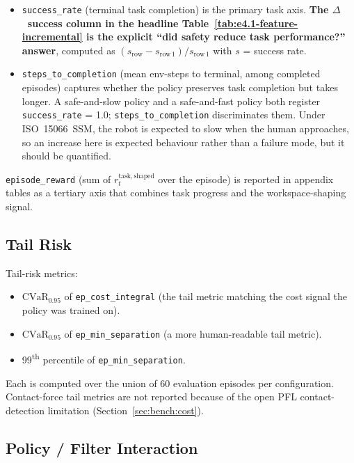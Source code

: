 \documentclass[11pt,a4paper]{report}
\newcommand{\ssm}{SSM}
\newcommand{\pfl}{PFL}
\newcommand{\iso}{ISO~15066}
\newcommand{\cvar}{\ensuremath{\mathrm{CVaR}}}
\begin{document}
\begin{itemize}[topsep=2pt,itemsep=1pt]
\item \texttt{success\_rate} (terminal task completion) is the
  primary task axis. \textbf{The $\Delta$~success column in the
  headline Table~\ref{tab:e4.1-feature-incremental} is the explicit
  ``did safety reduce task performance?'' answer}, computed as
  $(s_{\mathrm{row}} - s_{\mathrm{row\,1}})/s_{\mathrm{row\,1}}$
  with $s$ = success rate.
\item \texttt{steps\_to\_completion} (mean env-steps to terminal,
  among completed episodes) captures whether the policy preserves
  task completion but takes longer. A safe-and-slow policy and a
  safe-and-fast policy both register \texttt{success\_rate} = 1.0;
  \texttt{steps\_to\_completion} discriminates them. Under
  \iso{}~\ssm{}, the robot is expected to slow when the human
  approaches, so an increase here is expected behaviour rather than
  a failure mode, but it should be quantified.
\end{itemize}

\texttt{episode\_reward} (sum of $r^{\mathrm{task,shaped}}_t$ over
the episode) is reported in appendix tables as a tertiary axis
that combines task progress and the workspace-shaping signal.

\subsection{Tail Risk}
\label{sec:setup:metrics:tail}

Tail-risk metrics:
\begin{itemize}[topsep=2pt,itemsep=1pt]
\item $\cvar_{0.95}$ of \texttt{ep\_cost\_integral} (the tail metric
  matching the cost signal the policy was trained on).
\item $\cvar_{0.95}$ of \texttt{ep\_min\_separation} (a more
  human-readable tail metric).
\item 99\textsuperscript{th} percentile of
  \texttt{ep\_min\_separation}.
\end{itemize}
Each is computed over the union of 60 evaluation episodes per
configuration. Contact-force tail metrics are not reported because
of the open \pfl{} contact-detection limitation
(Section~\ref{sec:bench:cost}).

\subsection{Policy / Filter Interaction}
\label{sec:setup:metrics:interaction}
\end{document}
